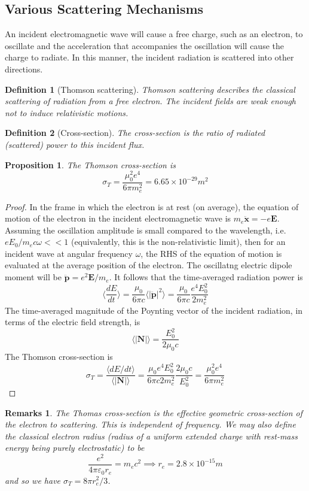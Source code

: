 \documentclass[a4paper]{article}
\newtheorem{remarks}{Remarks}[section]
\theoremstyle{new}
\newtheorem{defi}{Definition}[section]
\newtheorem{prop}{Proposition}[section]
\begin{document}
\subsection{Various Scattering Mechanisms}
An incident electromagnetic wave will cause a free charge, such as an electron, to oscillate and the acceleration that accompanies the oscillation will cause the charge to radiate. In this manner, the incident radiation is scattered into other directions.
\begin{defi}[Thomson scattering]
Thomson scattering describes the classical scattering of radiation from a free electron. The incident fields are weak enough not to induce relativistic motions.
\end{defi}
\begin{defi}[Cross-section]
The cross-section is the ratio of radiated (scattered) power to this incident flux.
\end{defi}
\begin{prop}
The Thomson cross-section is 
$$\sigma_T=\frac{\mu_0^2e^4}{6\pi m_e^2}=6.65\times10^{-29}m^2$$
\end{prop}
\begin{proof}
In the frame in which the electron is at rest (on average), the equation of motion of the electron in the incident electromagnetic wave is $m_e\mathbf{\ddot{x}}=-e\mathbf{E}$. Assuming the oscillation amplitude is small compared to the wavelength, i.e. $eE_0/m_ec\omega<<1$ (equivalently, this is the non-relativistic limit), then for an incident wave at angular frequency $\omega$, the RHS of the equation of motion is evaluated at the average position of the electron. The oscillatng electric dipole moment will be $\mathbf{\ddot{p}}=e^2\mathbf{E}/m_e$. It follows that the time-averaged radiation power is
$$\bigg\langle\frac{dE}{dt}\bigg\rangle=\frac{\mu_0}{6\pi c}\langle|\mathbf{\ddot{p}}|^2\rangle=\frac{\mu_0}{6\pi c}\frac{e^4E_0^2}{2m_e^2}$$
The time-averaged magnitude of the Poynting vector of the incident radiation, in terms of the electric field strength, is
$$\langle|\mathbf{N}|\rangle=\frac{E_0^2}{2\mu_0c}$$
The Thomson cross-section is
$$\sigma_T=\frac{\langle dE/dt\rangle}{\langle|\mathbf{N}|\rangle}=\frac{\mu_0e^4E_0^2}{6\pi c 2m_e^2}\frac{2\mu_0c}{E_0^2}=\frac{\mu_0^2e^4}{6\pi m_e^2}$$
\end{proof}
\begin{remarks}
The Thomas cross-section is the effective geometric cross-section of the electron to scattering. This is independent of frequency. We may also define the classical electron radius (radius of a uniform extended charge with rest-mass energy being purely electrostatic) to be
$$\frac{e^2}{4\pi\varepsilon_0r_e}=m_ec^2\implies r_e=2.8\times10^{-15}m$$
and so we have $\sigma_T=8\pi r_e^2/3$.
\end{remarks}
\end{document}

